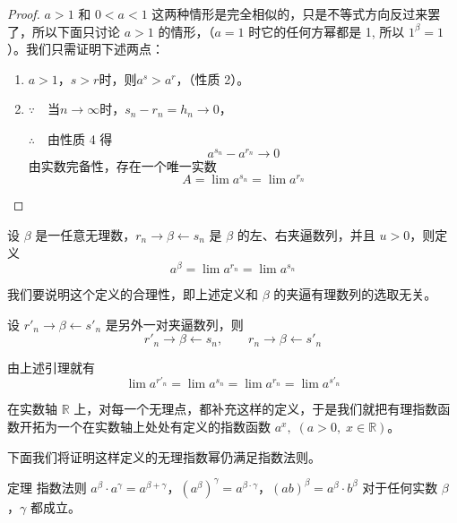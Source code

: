 \begin{proof}
$a>1$ 和 $0<a<1$ 这两种情形是完全相似的，只是不等式方向反过来罢了，所以下面只讨论 $a>1$ 的情形，（$a=1$ 时它的任何方幂都是 1, 所以 $1^{\beta}=1$）。我们只需证明下述两点：
\begin{enumerate}
  \item $a>1$，$s>r$时，则$a^s>a^r$，（性质 2）。
  \item $\because\quad $当$n\to\infty$时，$s_n-r_n=h_n\to 0$，
  
  $\therefore\quad $由性质 4 得
  \[a^{s_n}-a^{r_n}\to 0\]
  由实数完备性，存在一个唯一实数
  \[ A=\lim a^{s_n}=\lim a^{r_n}\]
\end{enumerate}
\end{proof}

\begin{Definition}
设 $\beta$ 是一任意无理数，$r_n\to\beta\leftarrow s_n$ 是 $\beta$ 的左、右夹逼数列，并且 $u>0$，则定义
\[a^{\beta}=\lim a^{r_n}=\lim a^{s_n}\]
\end{Definition}


我们要说明这个定义的合理性，即上述定义和 $\beta$ 的夹逼有理数列的选取无关。

设 $r'_n\to\beta\leftarrow s'_n$ 是另外一对夹逼数列，则
\[r'_n\to\beta \leftarrow s_n,\qquad r_n\to\beta\leftarrow s'_n\]

由上述引理就有
\[\lim a^{r'_n}=\lim a^{s_n}=\lim a^{r_n}=\lim a^{s'_n}\]

在实数轴 $\mathbb{R}$ 上，对每一个无理点，都补充这样的定义，于是我们就把有理指数函数开拓为一个在实数轴上处处有定义的指数函数 $a^x,\; (a>0,\; x\in\mathbb{R})$。

下面我们将证明这样定义的无理指数幂仍满足指数法则。

\begin{Theorem}{定理}
指数法则 $a^{\beta}\cdot a^{\gamma}=a^{\beta+\gamma}$，$\left(a^{\beta}\right)^{\gamma}=a^{\beta\cdot \gamma}$，$(ab)^{\beta}=a^{\beta}\cdot b^{\beta}$ 对于任何实数 $\beta$，$\gamma$ 都成立。
\end{Theorem}
 

